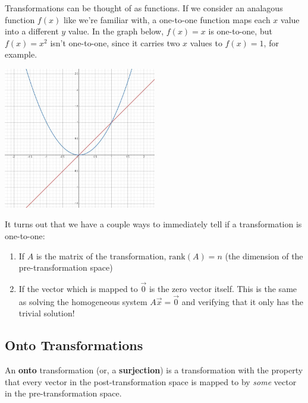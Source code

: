 \documentclass[11pt]{exam}
\begin{document}
    Transformations can be thought of as functions. If we consider an analagous function $f(x)$ like we're familiar with, a one-to-one function
    maps each $x$ value into a different $y$ value. In the graph below, $f(x) = x$ is one-to-one, but $f(x) = x^2$ isn't one-to-one, since it carries
    two $x$ values to $f(x) = 1$, for example.

    \begin{center}
        \includegraphics[width=0.5\textwidth]{one_to_one.JPG}
    \end{center}

    It turns out that we have a couple ways to immediately tell if a transformation is one-to-one:
    \begin{enumerate}
        \item If $A$ is the matrix of the transformation, $\text{rank}(A) = n$ (the dimension of the pre-transformation space)
        \item If the  vector which is mapped to $\vec{0}$ is the zero vector itself. This is the same as solving the homogeneous system
        $A \vec{x} = \vec{0}$ and verifying that it only has the trivial solution!
    \end{enumerate}

    \pagebreak
    \subsection{Onto Transformations}
    An \textbf{onto} transformation (or, a \textbf{surjection}) is a transformation with the property that every vector in the post-transformation
    space is mapped to by \textit{some} vector in the pre-transformation space.
\end{document}
